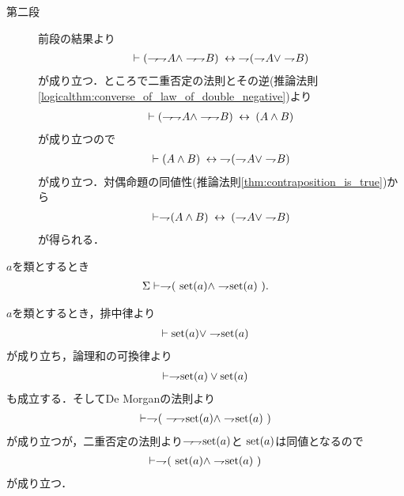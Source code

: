 \begin{prf}
\begin{description}
			\item[第二段]
				前段の結果より
				\begin{align}
					\vdash (\negation \negation A \wedge \negation \negation B)
					\lrarrow \negation (\negation A \vee \negation B)
				\end{align}
				が成り立つ．ところで二重否定の法則とその逆(推論法則\ref{logicalthm:converse_of_law_of_double_negative})より
				\begin{align}
					\vdash (\negation \negation A \wedge \negation \negation B)
					\lrarrow (A \wedge B)
				\end{align}
				が成り立つので
				\begin{align}
					\vdash (A \wedge B) 
					\lrarrow \negation (\negation A \vee \negation B)
				\end{align}
				が成り立つ．対偶命題の同値性(推論法則\ref{thm:contraposition_is_true})から
				\begin{align}
					\vdash \negation (A \wedge B)
					\lrarrow (\negation A \vee \negation B)
				\end{align}
				が得られる．
				\QED
		\end{description}
	\end{prf}
	
	
	\begin{screen}
		\begin{thm}[集合であり真類でもある類は存在しない]
			$a$を類とするとき
			\begin{align}
				\Sigma \vdash \negation (\ \set{a} \wedge \negation \set{a}\ ).
			\end{align}
		\end{thm}
	\end{screen}
	
	\begin{prf}
		$a$を類とするとき，排中律より
		\begin{align}
			\vdash \set{a} \vee \negation \set{a}
		\end{align}
		が成り立ち，論理和の可換律より
		\begin{align}
			\vdash \negation \set{a} \vee \set{a}
		\end{align}
		も成立する．そしてDe Morganの法則より
		\begin{align}
			\vdash \negation (\ \negation \negation \set{a} \wedge \negation \set{a}\ )
		\end{align}
		が成り立つが，二重否定の法則より$\negation \negation \set{a}$と
		$\set{a}$は同値となるので
		\begin{align}
			\vdash \negation (\ \set{a} \wedge \negation \set{a}\ )
		\end{align}
		が成り立つ．
		\QED
	\end{prf}
	
